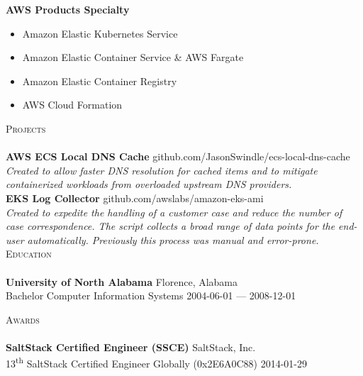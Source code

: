 \documentclass[a4paper]{article}
\newcommand{\lineunder} {
    \vspace*{-8pt} \\
    \hspace*{-18pt} \hrulefill \\
}
\newcommand{\header} [1] {
    {\hspace*{-18pt}\vspace*{6pt} \textsc{#1}}
    \vspace*{-6pt} \lineunder
}
\begin{document}
\textbf{AWS Products Specialty} \\
\vspace{-1mm}
\begin{itemize} \itemsep 1pt
    \item Amazon Elastic Kubernetes Service
    \item Amazon Elastic Container Service \& AWS Fargate
    \item Amazon Elastic Container Registry
    \item AWS Cloud Formation
\end{itemize}

\header{Projects}

\textbf{AWS ECS Local DNS Cache} \hfill{github.com/JasonSwindle/ecs-local-dns-cache} \\
\textit{Created to allow faster DNS resolution for cached items and to mitigate containerized workloads from overloaded upstream DNS providers.} \\[1\baselineskip]

\textbf{EKS Log Collector} \hfill{github.com/awslabs/amazon-eks-ami} \\
\textit{Created to expedite the handling of a customer case and reduce the number of case correspondence. The script collects a broad range of data points for the end-user automatically. Previously this process  was manual and error-prone.} \\[1\baselineskip]

\header{Education}
\textbf{University of North Alabama} \hfill{Florence, Alabama} \\
Bachelor Computer Information Systems \hfill{2004-06-01 --- 2008-12-01} \\
\vspace{2mm}

\header{Awards}
\textbf{SaltStack Certified Engineer (SSCE)} \hfill{SaltStack, Inc.} \\
13\textsuperscript{th} SaltStack Certified Engineer Globally (0x2E6A0C88) \hfill{2014-01-29} \\
\vspace*{2mm}
\end{document}
